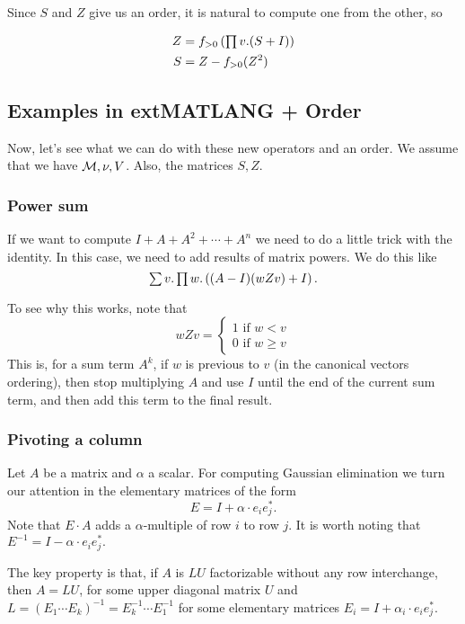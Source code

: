 Since $S$ and $Z$ give us an order, it is natural to compute one from the other, so

\begin{align*}
Z&=f_{>0}\left(\textstyle\prod v. (S+I)\right) \\
S&=Z-f_{>0}(Z^2)
\end{align*}

\subsection{Examples in extMATLANG + Order}

Now, let's see what we can do with these new operators and an order. We assume that we have $\mathcal{M},\nu, V$. Also, the matrices $S,Z$.

\subsubsection{Power sum}

If we want to compute $I+ A + A^2 + \cdots + A^n$ we need to do a little trick with the identity. In this case, we need to add results of matrix powers. We do this like $$\textstyle\sum v.\textstyle\prod w. \left( (A-I)(wZv) + I\right).$$

To see why this works, note that
\[
  			wZv=\begin{cases}
               1 \text{ if } w<v \\
               0 \text{ if } w\geq v
            \end{cases}
		\]
This is, for a sum term $A^k$, if $w$ is previous to $v$ (in the canonical vectors ordering), then stop multiplying $A$ and use $I$ until the end of the current sum term, and then add this term to the final result.

\subsubsection{Pivoting a column}

Let $A$ be a matrix and $\alpha$ a scalar. For computing Gaussian elimination we turn our attention in the elementary matrices of the form $$E=I + \alpha\cdot e_ie_j^*.$$ Note that $E\cdot A$ adds a $\alpha$-multiple of row $i$ to row $j$. It is worth noting that $E^{-1}= I - \alpha\cdot e_ie_j^*.$

The key property is that, if $A$ is $LU$ factorizable without any row interchange, then $A=LU$, for some upper diagonal matrix $U$ and $L=(E_1\cdots E_k)^{-1}=E_k^{-1}\cdots E_1^{-1}$ for some elementary matrices $E_i=I + \alpha_i\cdot e_ie_j^*.$

